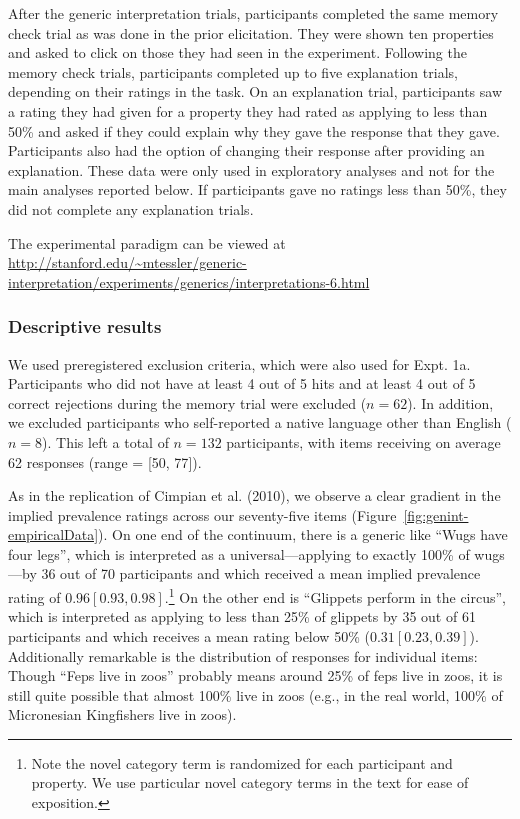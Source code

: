 \documentclass[floatsintext,doc]{apa6}
\let\rmarkdownfootnote\footnote%
\def\footnote{\protect\rmarkdownfootnote}
\begin{document}
After the generic interpretation trials, participants completed the same memory check trial as was done in the prior elicitation.
They were shown ten properties and asked to click on those they had seen in the experiment.
Following the memory check trials, participants completed up to five explanation trials, depending on their ratings in the task.
On an explanation trial, participants saw a rating they had given for a property they had rated as applying to less than 50\% and asked if they could explain why they gave the response that they gave.
Participants also had the option of changing their response after providing an explanation.
These data were only used in exploratory analyses and not for the main analyses reported below.
If participants gave no ratings less than 50\%, they did not complete any explanation trials.

The experimental paradigm can be viewed at \url{http://stanford.edu/~mtessler/generic-interpretation/experiments/generics/interpretations-6.html}

\hypertarget{descriptive-results}{%
\subsubsection{Descriptive results}\label{descriptive-results}}

We used preregistered exclusion criteria, which were also used for Expt. 1a.
Participants who did not have at least 4 out of 5 hits and at least 4 out of 5 correct rejections during the memory trial were excluded (\(n = 62\)).
In addition, we excluded participants who self-reported a native language other than English (\(n = 8\)).
This left a total of \(n = 132\) participants, with items receiving on average 62 responses (range = {[}50, 77{]}).

As in the replication of Cimpian et al. (2010), we observe a clear gradient in the implied prevalence ratings across our seventy-five items (Figure~\ref{fig:genint-empiricalData}).
On one end of the continuum, there is a generic like \enquote{Wugs have four legs}, which is interpreted as a universal---applying to exactly 100\% of wugs---by 36 out of 70 participants and which received a mean implied prevalence rating of \(0.96 [0.93, 0.98]\).\footnote{Note the novel category term is randomized for each participant and property.
  We use particular novel category terms in the text for ease of exposition.}
On the other end is \enquote{Glippets perform in the circus}, which is interpreted as applying to less than 25\% of glippets by 35 out of 61 participants and which receives a mean rating below 50\% (\(0.31 [0.23, 0.39]\)).
Additionally remarkable is the distribution of responses for individual items: Though \enquote{Feps live in zoos} probably means around 25\% of feps live in zoos, it is still quite possible that almost 100\% live in zoos (e.g., in the real world, 100\% of Micronesian Kingfishers live in zoos).
\end{document}
